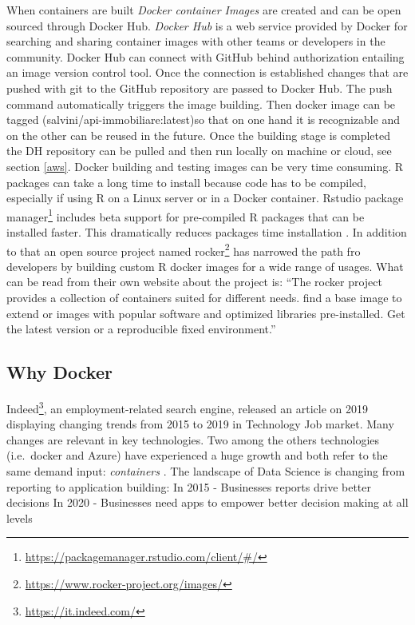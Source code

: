 \documentclass[
  12pt,
  a4paper,
  oneside]{book}
\DeclareRobustCommand{\href}[2]{#2\footnote{\url{#1}}}
\theoremstyle{definition}
\theoremstyle{definition}
\theoremstyle{definition}
\theoremstyle{remark}
\begin{document}
When containers are built \emph{Docker container Images} are created and can be open sourced through Docker Hub.
\emph{Docker Hub} is a web service provided by Docker for searching and sharing container images with other teams or developers in the community. Docker Hub can connect with GitHub behind authorization entailing an image version control tool. Once the connection is established changes that are pushed with git to the GitHub repository are passed to Docker Hub. The push command automatically triggers the image building. Then docker image can be tagged (salvini/api-immobiliare:latest)so that on one hand it is recognizable and on the other can be reused in the future. Once the building stage is completed the DH repository can be pulled and then run locally on machine or cloud, see section \ref{aws}.
Docker building and testing images can be very time consuming. R packages can take a long time to install because code has to be compiled, especially if using R on a Linux server or in a Docker container.
Rstudio \href{https://packagemanager.rstudio.com/client/\#/}{package manager} includes beta support for pre-compiled R packages that can be installed faster. This dramatically reduces packages time installation \citep{nolis_2020}.
In addition to that an open source project named \href{https://www.rocker-project.org/images/}{rocker} has narrowed the path fro developers by building custom R docker images for a wide range of usages. What can be read from their own website about the project is: ``The rocker project provides a collection of containers suited for different needs. find a base image to extend or images with popular software and optimized libraries pre-installed. Get the latest version or a reproducible fixed environment.''

\hypertarget{why-docker}{%
\subsection{Why Docker}\label{why-docker}}

\href{https://it.indeed.com/}{Indeed}, an employment-related search engine, released an article on 2019 displaying changing trends from 2015 to 2019 in Technology Job market. Many changes are relevant in key technologies. Two among the others technologies (i.e.~docker and Azure) have experienced a huge growth and both refer to the same demand input: \emph{containers} .
The landscape of Data Science is changing \citep{Skills_Explorer} from reporting to application building:
In 2015 - Businesses reports drive better decisions
In 2020 - Businesses need apps to empower better decision making at all levels
\end{document}
